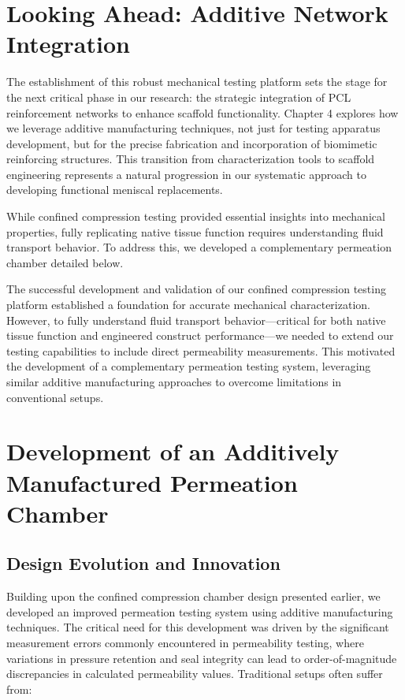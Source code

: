 \section{Looking Ahead: Additive Network Integration}

The establishment of this robust mechanical testing platform sets the stage for the next critical phase in our research: the strategic integration of PCL reinforcement networks to enhance scaffold functionality. Chapter 4 explores how we leverage additive manufacturing techniques, not just for testing apparatus development, but for the precise fabrication and incorporation of biomimetic reinforcing structures. This transition from characterization tools to scaffold engineering represents a natural progression in our systematic approach to developing functional meniscal replacements.

While confined compression testing provided essential insights into mechanical properties, fully replicating native tissue function requires understanding fluid transport behavior. To address this, we developed a complementary permeation chamber detailed below.


The successful development and validation of our confined compression testing platform established a foundation for accurate mechanical characterization. However, to fully understand fluid transport behavior—critical for both native tissue function and engineered construct performance—we needed to extend our testing capabilities to include direct permeability measurements. This motivated the development of a complementary permeation testing system, leveraging similar additive manufacturing approaches to overcome limitations in conventional setups.


\section{Development of an Additively Manufactured Permeation Chamber}

\subsection{Design Evolution and Innovation}

Building upon the confined compression chamber design presented earlier, we developed an improved permeation testing system using additive manufacturing techniques. The critical need for this development was driven by the significant measurement errors commonly encountered in permeability testing, where variations in pressure retention and seal integrity can lead to order-of-magnitude discrepancies in calculated permeability values. Traditional setups often suffer from:

